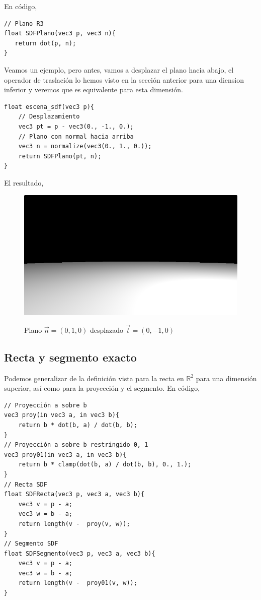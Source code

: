 En código,

\begin{lstlisting}
// Plano R3
float SDFPlano(vec3 p, vec3 n){
   return dot(p, n);
}
\end{lstlisting}

Veamos un ejemplo, pero antes, vamos a desplazar el plano hacia abajo, el operador de traslación lo hemos visto en la sección anterior para una diension inferior y veremos que es equivalente para esta dimensión.
\begin{lstlisting}
float escena_sdf(vec3 p){
    // Desplazamiento
    vec3 pt = p - vec3(0., -1., 0.);
    // Plano con normal hacia arriba
    vec3 n = normalize(vec3(0., 1., 0.));
    return SDFPlano(pt, n);
}
\end{lstlisting}

El resultado,

\begin{figure}[H]
  \centering
  \captionsetup{justification=centering}%
  \includegraphics[width=1.0\textwidth]{secciones/imagenes/sdf/3d/sdf_plano.png}\label{fig:plano}
  \caption{Plano \(\Vec{n}=(0,1,0)\) desplazado \(\Vec{t}=(0, -1, 0)\)}
\end{figure}

\subsection{Recta y segmento exacto}

Podemos generalizar de la definición vista para la recta en \(\mathbb{R}^2\) para una dimensión superior, así como para la proyección y el segmento.
En código,
\begin{lstlisting}
// Proyección a sobre b
vec3 proy(in vec3 a, in vec3 b){
    return b * dot(b, a) / dot(b, b);
}
// Proyección a sobre b restringido 0, 1
vec3 proy01(in vec3 a, in vec3 b){
    return b * clamp(dot(b, a) / dot(b, b), 0., 1.);
}
// Recta SDF
float SDFRecta(vec3 p, vec3 a, vec3 b){
    vec3 v = p - a;
    vec3 w = b - a;
    return length(v -  proy(v, w));
}
// Segmento SDF
float SDFSegmento(vec3 p, vec3 a, vec3 b){
    vec3 v = p - a;
    vec3 w = b - a;
    return length(v -  proy01(v, w));
}
\end{lstlisting}


